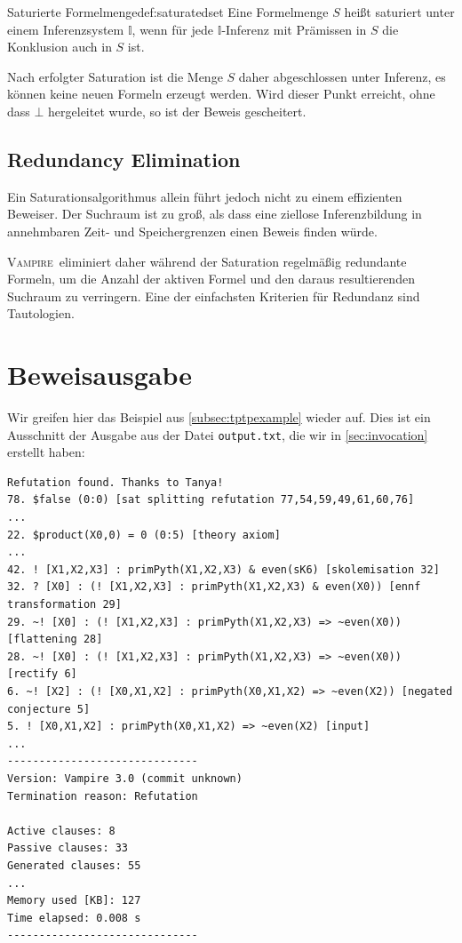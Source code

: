 \documentclass{article}
\newcommand{\vampire}{\textsc{Vampire}~}
\begin{document}
\begin{definition}{Saturierte Formelmenge}{def:saturatedset}
	Eine Formelmenge $S$ heißt saturiert unter einem Inferenzsystem $\mathds{I}$, wenn für jede $\mathds{I}$-Inferenz mit Prämissen in $S$ die Konklusion auch in $S$ ist.
\end{definition}

Nach erfolgter Saturation ist die Menge $S$ daher abgeschlossen unter Inferenz, es können
keine neuen Formeln erzeugt werden.
Wird dieser Punkt erreicht, ohne dass $\bot$ hergeleitet wurde, so ist der Beweis gescheitert.

\subsection{Redundancy Elimination}
\label{subsec:redund}

Ein Saturationsalgorithmus allein führt jedoch nicht zu einem effizienten Beweiser.
Der Suchraum ist zu groß, als dass eine ziellose Inferenzbildung in annehmbaren Zeit- und
Speichergrenzen einen Beweis finden würde.

\vampire eliminiert daher während der Saturation regelmäßig redundante Formeln,
um die Anzahl der aktiven Formel und den daraus resultierenden Suchraum zu verringern.
Eine der einfachsten Kriterien für Redundanz sind Tautologien. 

\section{Beweisausgabe}
\label{sec:output}
Wir greifen hier das Beispiel aus \ref{subsec:tptpexample} wieder auf.
Dies ist ein Ausschnitt der Ausgabe aus der Datei \verb|output.txt|, die wir in \ref{sec:invocation}
erstellt haben:

\begin{verbatim}
Refutation found. Thanks to Tanya!
78. $false (0:0) [sat splitting refutation 77,54,59,49,61,60,76]
...
22. $product(X0,0) = 0 (0:5) [theory axiom]
...
42. ! [X1,X2,X3] : primPyth(X1,X2,X3) & even(sK6) [skolemisation 32]
32. ? [X0] : (! [X1,X2,X3] : primPyth(X1,X2,X3) & even(X0)) [ennf transformation 29]
29. ~! [X0] : (! [X1,X2,X3] : primPyth(X1,X2,X3) => ~even(X0)) [flattening 28]
28. ~! [X0] : (! [X1,X2,X3] : primPyth(X1,X2,X3) => ~even(X0)) [rectify 6]
6. ~! [X2] : (! [X0,X1,X2] : primPyth(X0,X1,X2) => ~even(X2)) [negated conjecture 5]
5. ! [X0,X1,X2] : primPyth(X0,X1,X2) => ~even(X2) [input]
...
------------------------------
Version: Vampire 3.0 (commit unknown)
Termination reason: Refutation

Active clauses: 8
Passive clauses: 33
Generated clauses: 55
...
Memory used [KB]: 127
Time elapsed: 0.008 s
------------------------------
\end{verbatim}
\end{document}
